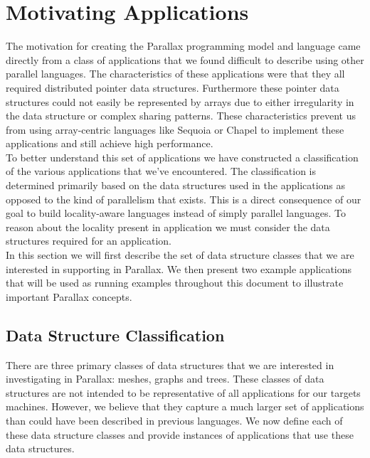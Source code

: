 \documentclass{article}
\theoremstyle{definition}
\begin{document}

\section{Motivating Applications \label{Applications}}

\noindent
The motivation for creating the Parallax programming model and language came
directly from a class of applications that we found difficult to describe
using other parallel languages.  The characteristics of these applications were that
they all required distributed pointer data structures.  Furthermore these pointer data
structures could not easily be represented by arrays due to either irregularity
in the data structure or complex sharing patterns.  These characteristics
prevent us from using array-centric languages like Sequoia \cite{Fatahalian06} 
or Chapel \cite{Chamberlain07} to implement these applications and still
achieve high performance. \\

\noindent
To better understand this set of applications we have constructed a
classification of the various applications that we've encountered.  The
classification is determined primarily based on the data structures used in
the applications as opposed to the kind of parallelism that exists.  This
is a direct consequence of our goal to build locality-aware languages instead
of simply parallel languages.  To reason about the locality present in
application we must consider the data structures required for an application.\\

\noindent
In this section we will first describe the set of data structure classes
that we are interested in supporting in Parallax.  We then present two example
applications that will be used as running examples throughout this document
to illustrate important Parallax concepts.

\subsection{Data Structure Classification \label{DataStructures}}
\noindent
There are three primary classes of data structures that we are interested
in investigating in Parallax: meshes, graphs and trees.  These classes of data 
structures are not intended to be representative of all applications for
our targets machines.  However, we believe that they capture a 
much larger set of applications than could have been described in previous
languages.  We now define each of these data structure classes and provide
instances of applications that use these data structures.
\end{document}
